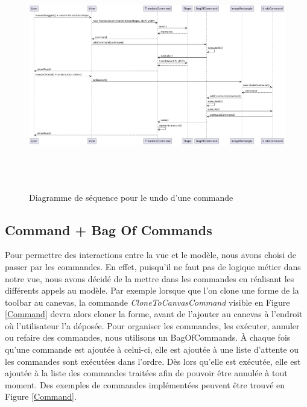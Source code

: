 \documentclass{article}
\begin{document}
\begin{figure}[h]
    \centering
    \includegraphics[width=\textwidth,height=10.0cm,keepaspectratio]{DS_memento.png}
    \caption{Diagramme de séquence pour le undo d'une commande}
    \label{DSMemento}
\end{figure}
\FloatBarrier

\subsection{Command + Bag Of Commands} \label{BoC}

Pour permettre des interactions entre la vue et le modèle, nous avons choisi de passer par les commandes. En effet,
puisqu'il ne faut pas de logique métier dans notre vue, nous avons décidé de la mettre dans les commandes en réalisant 
les différents appels au modèle. Par exemple lorsque que l'on clone une forme de la toolbar
au canevas, la commande \textit{CloneToCanvasCommand} visible en Figure \ref{Command} devra alors cloner la forme, avant de
l'ajouter au canevas à l'endroit où l'utilisateur l'a déposée. Pour organiser les commandes, les exécuter, annuler ou refaire des commandes, 
 nous utilisons un BagOfCommands. À chaque fois qu'une commande est ajoutée à celui-ci, elle est ajoutée à une liste d'attente ou les commandes 
 sont exécutées dans l'ordre. Dès lors qu'elle est exécutée, elle est ajoutée à la liste des commandes traitées afin de pouvoir être annulée à tout 
 moment. Des exemples de commandes implémentées peuvent être trouvé en Figure \ref{Command}.
\end{document}
